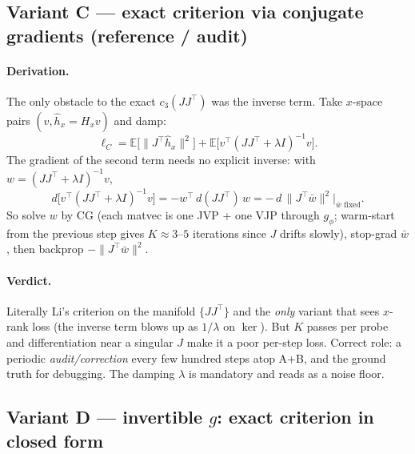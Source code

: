 \documentclass[11pt]{article}
\theoremstyle{plain}
\theoremstyle{definition}
\theoremstyle{remark}
\newcommand{\E}{\mathbb{E}}
\newcommand{\norm}[1]{\lVert #1 \rVert}
\begin{document}
\subsection{Variant C --- exact criterion via conjugate gradients (reference / audit)}
\label{sub:C}
\paragraph{Derivation.} The only obstacle to the exact $c_3(JJ^{\!\top})$ was the inverse
term. Take $x$-space pairs $(v,\hat h_x=H_x v)$ and damp:
\begin{equation}
\label{eq:C}
  \ell_C=\E\big[\norm{J^{\!\top}\hat h_x}^2\big]
        +\E\big[v^{\!\top}(JJ^{\!\top}+\lambda I)^{-1}v\big].
\end{equation}
The gradient of the second term needs no explicit inverse: with
$w=(JJ^{\!\top}+\lambda I)^{-1}v$,
\begin{equation}
  d\big[v^{\!\top}(JJ^{\!\top}+\lambda I)^{-1}v\big]
   =-w^{\!\top}\,d(JJ^{\!\top})\,w
   =-\,d\,\norm{J^{\!\top}\bar w}^2\Big|_{\bar w\text{ fixed}} .
\end{equation}
So solve $w$ by CG (each matvec is one JVP + one VJP through $g_\phi$; warm-start from the
previous step gives $K\approx3$--$5$ iterations since $J$ drifts slowly), stop-grad $\bar w$,
then backprop $-\norm{J^{\!\top}\bar w}^2$.

\paragraph{Verdict.} Literally Li's criterion on the manifold $\{JJ^{\!\top}\}$ and the
\emph{only} variant that sees $x$-rank loss (the inverse term blows up as $1/\lambda$ on
$\ker$). But $K$ passes per probe and differentiation near a singular $J$ make it a poor
per-step loss. Correct role: a periodic \emph{audit/correction} every few hundred steps atop
A+B, and the ground truth for debugging. The damping $\lambda$ is mandatory and reads as a
noise floor.

\subsection{Variant D --- invertible $g$: exact criterion in closed form}
\label{sub:D}
\end{document}
